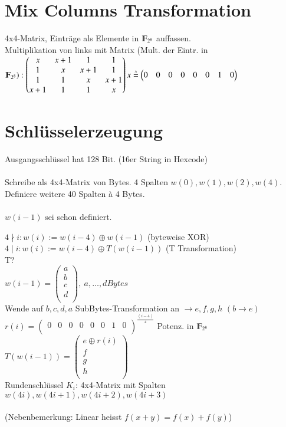 \section{Mix Columns Transformation}
4x4-Matrix, Eintr\"age als Elemente in $\F_{2^8}$ auffassen.\\
Multiplikation von links mit Matrix
(Mult. der Eintr. in $\F_{2^8}):
\begin{pmatrix}
	x & x+1 & 1 & 1\\
	1 & x & x+1 & 1\\
	1 & 1 & x & x+1\\
	x+1 & 1 & 1 & x\\
\end{pmatrix}\\
x \entspricht
\begin{pmatrix}
	0 & 0 & 0 & 0 & 0 & 0 & 1 & 0\\
\end{pmatrix}$

\section{Schl\"usselerzeugung}
Ausgangsschl\"ussel hat 128 Bit. (16er String in Hexcode)\\
\\
Schreibe als 4x4-Matrix von Bytes. 4 Spalten $w(0), w(1), w(2), w(4)$. Definiere weitere 40 Spalten \`a 4 Bytes.\\
\\
$w(i-1)$ sei schon definiert.

$ 4 \nmid i : w(i) := w(i-4) \oplus w(i-1)$ (byteweise XOR)\\
$ 4 \mid i : w(i) := w(i-4) \oplus T(w(i-1))$ (T Transformation)\\
T?\\ $w(i-1) =
\begin{pmatrix}
	a\\
	b\\
	c\\
	d\\
\end{pmatrix} , \ a,\ldots,d Bytes$\\
Wende auf $b, c, d, a$ SubBytes-Transformation an $\rightarrow e, f, g, h$ $(b \rightarrow e)$\\ 
$r(i) =
\begin{pmatrix}
	0 & 0 & 0 & 0 & 0 & 0 & 1 & 0\\
\end{pmatrix}^{\frac{(i-4)}{4}}$ Potenz. in $\F_{2^8}$\\
$T(w(i-1)) = 
\begin{pmatrix}
	e \oplus r(i)\\
	f\\
	g\\
	h\\
\end{pmatrix}$\\
Rundenschl\"ussel $K_i$: 4x4-Matrix mit Spalten $w(4i), w(4i+1), w(4i+2), w(4i+3)$\\
\\
(Nebenbemerkung: Linear heisst $f(x+y) = f(x) + f(y)$)
